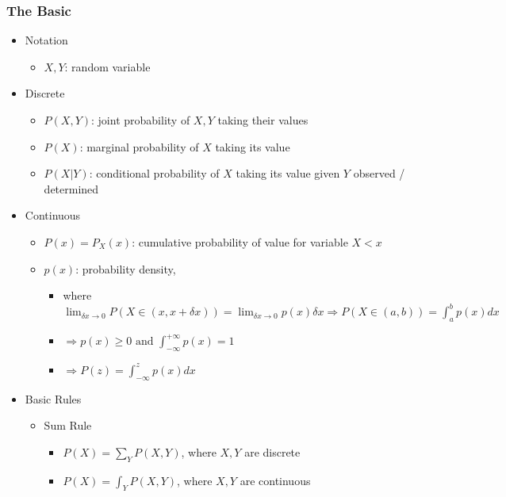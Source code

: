 \subsubsection{The Basic}
\begin{itemize}
\item Notation
	\begin{itemize}
	\item $X,Y$: random variable
	\end{itemize}
\item Discrete 
		\begin{itemize}
		\item $P(X,Y)$: joint probability of $X,Y$ taking their values
		\item $P(X)$: marginal probability of $X$ taking its value
		\item $P(X|Y)$: conditional probability of $X$ taking its value given $Y$ observed / determined
	\end{itemize}
	\item Continuous
		\begin{itemize}
		\item $P(x) = P_X(x)$: cumulative probability of value for variable $X < x$
		\item $p(x)$: probability density,
			\begin{itemize}
			\item where $\displaystyle \lim_{\delta x \rightarrow 0} P(X\in(x,x+\delta x)) = \lim_{\delta x \rightarrow 0}p(x)\delta x \Rightarrow \displaystyle P(X\in(a,b))=\int_a^b p(x)dx$
			\item $\displaystyle \Rightarrow p(x )\ge 0 \text{ and } \int^{+\infty}_{-\infty} p(x) = 1$
			\item $\Rightarrow P(z) = \int_{-\infty}^z p(x)dx$
			\end{itemize}
		\end{itemize}
\item Basic Rules
	\begin{itemize}
	\item Sum Rule
		\begin{itemize}
		\item $\displaystyle P(X) = \sum_Y P(X,Y)$, where $X,Y$ are discrete
		\item $\displaystyle P(X) = \int_Y P(X,Y)$, where $X,Y$ are continuous
		

\end{itemize}
\end{itemize}
\end{itemize}
